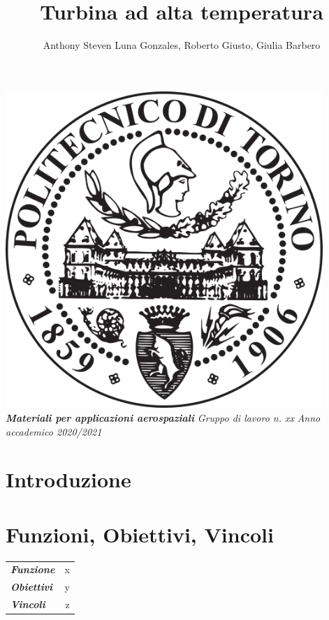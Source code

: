 \documentclass{article}
\author{Anthony Steven Luna Gonzales, Roberto Giusto, Giulia Barbero}
\title{Turbina ad alta temperatura}
\begin{document}
    \maketitle
    \begin{center}
        \includegraphics[width=0.9\textwidth]{Sources/polito_logo.png}\linebreak\newline
       \textbf{\textit{Materiali per applicazioni aerospaziali}}\linebreak\newline
        \textit{Gruppo di lavoro n. xx}\linebreak\newline
        \textit{Anno accademico 2020/2021}
    \end{center}

    \newpage
    \section{Introduzione}
    \section{Funzioni, Obiettivi, Vincoli}
        \begin{tabular}{l|r}
            \toprule
                \textbf{\textit{Funzione}}   & x\\
                \textbf{\textit{Obiettivi}}   & y\\ 
                \textbf{\textit{Vincoli}}   & z\\ 
            \bottomrule
        \end{tabular}   
\end{document}
